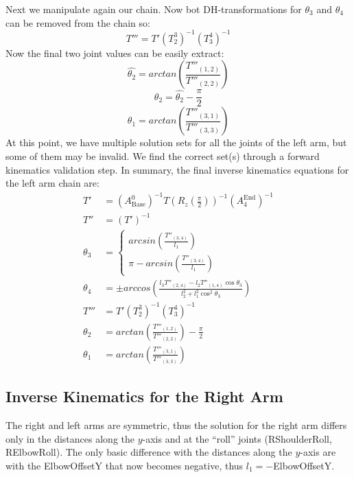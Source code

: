 Next we manipulate again our chain. Now bot DH-transformations for $\theta_3$ and $\theta_4$ can be removed from the chain so:
\[
T''' = T'\left(T_2^3\right)^{-1}\left(T_3^4\right)^{-1}
\]
Now the final two joint values can be easily extract:
\[
\widehat{\theta_2} = arctan\left(\frac{T'''_{(1,2)}}{T'''_{(2,2)}}\right)
\]
\[
\theta_2 = \widehat{\theta_2}-\frac{\pi}{2}
\]
\[
\theta_1 = arctan\left(\frac{T'''_{(3,1)}}{T'''_{(3,3)}}\right)
\]
At this point, we have multiple solution sets for all the joints of the left arm, but some of them may be invalid. We find the correct set(s) through a forward kinematics validation step. In summary, the final inverse kinematics equations for the left arm chain are:
\begin{align*}
T' &= \left(A_\text{Base}^0\right)^{-1}T\left(R_z(\tfrac{\pi}{2})\right)^{-1}\left(A_4^\text{End}\right)^{-1}\\
T'' &= \left(T'\right)^{-1}\\
\theta_3 &= \left\{
	\begin{array}{l}
	arcsin\left(\frac{T''_{(3,4)}}{l_1}\right)\\
	\pi-arcsin\left(\frac{T''_{(3,4)}}{l_1}\right)
	\end{array} \right.\\
\theta_4 &= \pm arccos\left( \frac{l_3 T''_{(2,4)} - l_2T''_{(1,4)}\cos\theta_3}{l_2^2+l_1^2\cos^2\theta_3} \right)\\
T''' &= T'\left(T_2^3\right)^{-1}\left(T_3^4\right)^{-1}\\
\theta_2 &= arctan\left(\frac{T'''_{(1,2)}}{T'''_{(2,2)}}\right)-\frac{\pi}{2}\\
\theta_1 &= arctan\left(\frac{T'''_{(3,1)}}{T'''_{(3,3)}}\right)
\end{align*}



\subsection{Inverse Kinematics for the Right Arm}

The right and left arms are symmetric, thus the solution for the right arm differs only in the distances along the $y$-axis and at the ``roll'' joints (RShoulderRoll, RElbowRoll). The only basic difference with the distances along the $y$-axis are with the ElbowOffsetY that now becomes negative, thus $l_1 = -$ElbowOffsetY.

